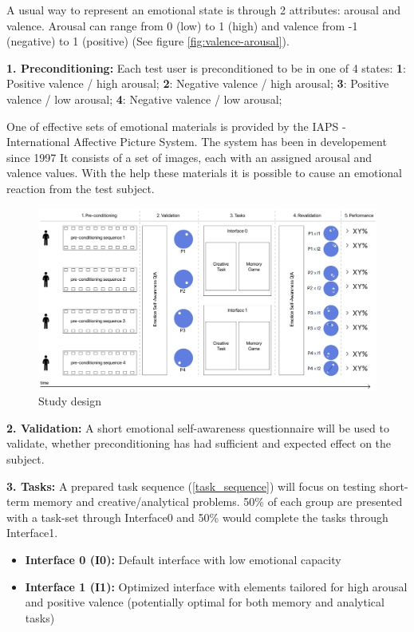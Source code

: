 A usual way to represent an emotional state is through 2 attributes: arousal and valence. Arousal can range from 0 (low) to 1 (high) and valence from -1 (negative) to 1 (positive) (See figure \ref{fig:valence-arousal}). 

\textbf{1. Preconditioning:} Each test user is preconditioned to be in one of 4 states:
 \textbf{1}: Positive valence / high arousal; 
 \textbf{2}: Negative valence / high arousal;
 \textbf{3}: Positive valence / low arousal;
 \textbf{4}: Negative valence / low arousal;

One of effective sets of emotional materials is provided by the IAPS - International Affective Picture System. The system has been in developement since 1997 \cite{Lang1997} It consists of a set of images, each with an assigned arousal and valence values. With the help these materials it is possible to cause an emotional reaction from the test subject.

\begin{figure}
	\begin{center}
		\includegraphics[width=1\textwidth]{images/study_design5.png}
		\caption{Study design\label{fig:scaled_diss}}
	\end{center}
\end{figure}

\textbf{2. Validation:} A short emotional self-awareness questionnaire will be used to validate, whether preconditioning has had sufficient and expected effect on the subject.

\textbf{3. Tasks:} A prepared task sequence (\ref{task_sequence}) will focus on testing short-term memory and creative/analytical problems. 
50\% of each group are presented with a task-set through Interface0 and 50\% would complete the tasks through Interface1.

\begin{itemize}
	\item \textbf{Interface 0 (I0):} Default interface with low emotional capacity
	\item \textbf{Interface 1 (I1):} Optimized interface with elements tailored for high arousal and positive valence (potentially optimal for both memory and analytical tasks) \cite[pp. 81 ff]{Brave2002} \cite{Heidig2015}
\end{itemize}

